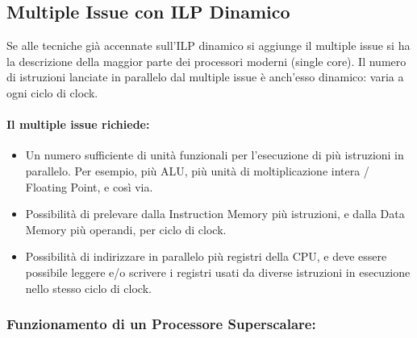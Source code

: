 \subsection{Multiple Issue con ILP Dinamico}

Se alle tecniche già accennate sull'ILP dinamico si aggiunge il multiple issue si ha la descrizione della maggior parte dei processori moderni (single core). Il numero di istruzioni lanciate in parallelo dal multiple issue è anch'esso dinamico: varia a ogni ciclo di clock. 

\paragraph{Il multiple issue richiede:} 

\begin{itemize}
  \item Un numero sufficiente di unità funzionali
per l’esecuzione di più istruzioni in parallelo. Per esempio, più
ALU, più unità di moltiplicazione intera / Floating Point, e così via.
\item Possibilità di prelevare dalla Instruction Memory più
istruzioni, e dalla Data Memory più operandi, per ciclo di clock. 
\item Possibilità di indirizzare in parallelo più registri della CPU,
e deve essere possibile leggere e/o scrivere i registri usati da diverse
istruzioni in esecuzione nello stesso ciclo di clock.
\end{itemize}


\subsubsection{Funzionamento di un Processore Superscalare:}

